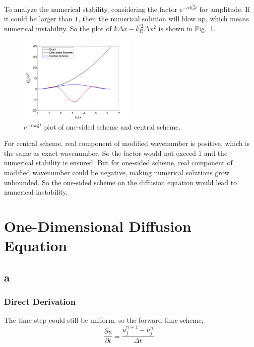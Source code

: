 \documentclass[letterpaper,10pt]{article}
\begin{document}
To analyze the numerical stability, considering the factor $e^{-\alpha k^{'2}_R t}$ for amplitude. If it could be larger than $1$, then 
the numerical solution will blow up, which means numerical instability. So the plot of $k\Delta x - k^{'2}_R\Delta x^2$ is shown in Fig.~\ref{fig1_1}. 
\begin{figure}[h]
  \centering
  \includegraphics[width=0.5\textwidth]{p1.png}
  \caption{$e^{-\alpha k^{'2}_R t}$ plot of one-sided scheme and central scheme. }
  \label{fig1_1}
\end{figure}

For central scheme, real component of modified wavenumber is positive, which is the same as exact wavenumber. So the factor would not exceed $1$ and 
the numerical stability is ensured. But for one-sided scheme, real component of modified wavenumber could be negative, making numerical solutions grow unbounded. 
So the one-sided scheme on the diffusion equation would lead to numerical instability. 
\newpage
\section{One-Dimensional Diffusion Equation}
\subsection{a}
\subsubsection{Direct Derivation}
The time step could still be uniform, so the forward-time scheme, 
\begin{equation*}
  \frac{\partial u}{\partial t}=\frac{u_j^{n+1}-u_j^n}{\Delta t}
\end{equation*}
\end{document}
